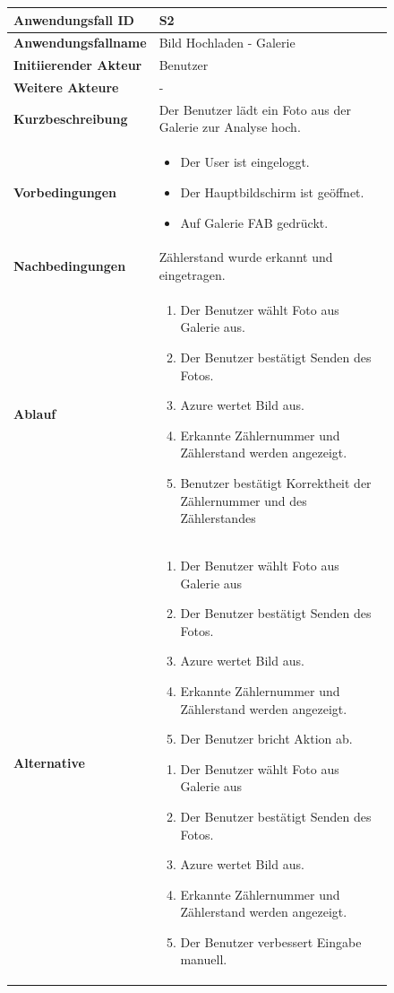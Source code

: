 \begin{figure}[h]
	\centering
	\begin{tabularx}{\textwidth}{ X | X }
		\textbf{Anwendungsfall ID} & S2 \\ \hline
		\textbf{Anwendungsfallname} & Bild Hochladen - Galerie \\ \hline
		\textbf{Initiierender Akteur} & Benutzer \\ \hline
		\textbf{Weitere Akteure} & - \\ \hline
		\textbf{Kurzbeschreibung} & Der Benutzer lädt ein Foto aus der Galerie zur Analyse hoch. \\ \hline
		\textbf{Vorbedingungen} &
		\begin {itemize}
			\item Der User ist eingeloggt.
			\item Der Hauptbildschirm ist geöffnet.
			\item Auf Galerie FAB gedrückt.
		\end{itemize}\\ \hline
		\textbf{Nachbedingungen} & Zählerstand wurde erkannt und eingetragen. \\ \hline
		\textbf{Ablauf} &
		\begin{enumerate}
			\item Der Benutzer wählt Foto aus Galerie aus.
			\item Der Benutzer bestätigt Senden des Fotos. 
			\item Azure wertet Bild aus.
			\item Erkannte Zählernummer und Zählerstand werden angezeigt. 
			\item Benutzer bestätigt Korrektheit der Zählernummer und des Zählerstandes
		\end{enumerate} \\ \hline
		\textbf{Alternative} & 
		\begin{enumerate}
			\item Der Benutzer wählt Foto aus Galerie aus 
			\item Der Benutzer bestätigt Senden des Fotos. 
			\item Azure wertet Bild aus. 
			\item Erkannte Zählernummer und Zählerstand werden angezeigt. 
			\item Der Benutzer bricht Aktion ab. 
		\end{enumerate}
		\begin{enumerate}
			\item Der Benutzer wählt Foto aus Galerie aus
			\item Der Benutzer bestätigt Senden des Fotos. 
			\item Azure wertet Bild aus.
			\item Erkannte Zählernummer und Zählerstand werden angezeigt. 
			\item Der Benutzer verbessert Eingabe manuell.
		\end{enumerate} \\
	\end{tabularx}
\end{figure}
